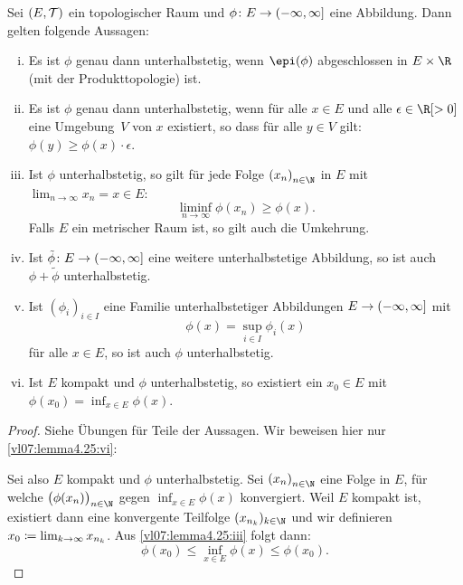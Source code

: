 \begin{thLemma} \label{vl07:lemma4.25}
    Sei $(E,\operatorname{\mathcal{T}})$ ein topologischer Raum und $\phi\colon E\to
    (-\infty,\infty]$ eine Abbildung. Dann gelten folgende Aussagen:
    \begin{enumerate}[(i)]
        \item \label{vl07:lemma4.25:i}
            Es ist $\phi$ genau dann unterhalbstetig, wenn $\epi(\phi)$
            abgeschlossen in $E\times\R$ (mit der Produkttopologie) ist.
            
        \item \label{vl07:lemma4.25:ii}
            Es ist $\phi$ genau dann unterhalbstetig, wenn für alle $x\in E$
            und alle $\epsilon\in\R[>0]$ eine Umgebung~$V$ von $x$ existiert, so
            dass für alle $y\in V$ gilt:
            $\phi(y)\geq\phi(x)\cdot\epsilon$.
            
        \item \label{vl07:lemma4.25:iii}
            Ist $\phi$ unterhalbstetig, so gilt für jede Folge $\nSeq x$ in $E$
            mit $\lim_{n\to\infty} x_n = x\in E$:
            \[ \liminf_{n\to\infty} \phi(x_n) \geq \phi(x) . \]
            Falls $E$ ein metrischer Raum ist, so gilt auch die Umkehrung.
            
        \item \label{vl07:lemma4.25:iv}
            Ist $\tilde\phi\colon E\to(-\infty,\infty]$ eine weitere
            unterhalbstetige Abbildung, so ist auch $\phi+\tilde\phi$
            unterhalbstetig.
            
        \item \label{vl07:lemma4.25:v}
            Ist $(\phi_i)_{i\in I}$ eine Familie unterhalbstetiger
            Abbildungen $E\to(-\infty,\infty]$ mit
            \[ \phi(x) = \sup_{i\in I} \phi_i(x)  \]
            für alle $x\in E$, so ist auch $\phi$ unterhalbstetig.
            
        \item \label{vl07:lemma4.25:vi}
            Ist $E$ kompakt und $\phi$ unterhalbstetig, so existiert ein
            $x_0\in E$ mit $\phi(x_0) = \inf_{x\in E} \phi(x)$.
    \end{enumerate}
\end{thLemma}

\begin{proof}
    Siehe Übungen für Teile der Aussagen. Wir beweisen hier nur
    \ref{vl07:lemma4.25:vi}:
    
    Sei also $E$ kompakt und $\phi$ unterhalbstetig. Sei $\nSeq x$ eine Folge in
    $E$, für welche $\bigl(\phi(x_n)\bigr)_{n\in\N}$ gegen $\inf_{x\in E}
    \phi(x)$ konvergiert. Weil $E$ kompakt ist, existiert dann eine konvergente
    Teilfolge $(x_{n_k})_{k\in\N}$ und wir definieren $x_0 \coloneqq
    \lim_{k\to\infty} x_{n_k}$. Aus \ref{vl07:lemma4.25:iii}\vphantom{)} folgt dann:
    \[ \phi(x_0) \leq \inf_{x\in E} \phi(x) \leq \phi(x_0)  . \]
\end{proof}

